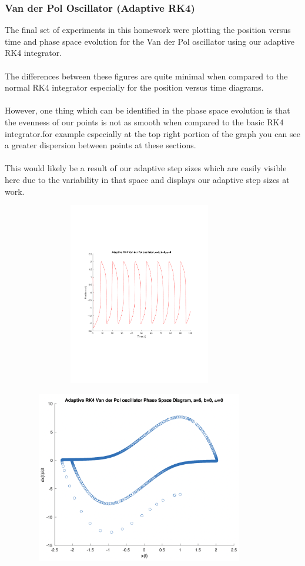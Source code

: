 \documentclass{article}
\begin{document}
\subsubsection{Van der Pol  Oscillator (Adaptive RK4)}
The final set of experiments in this homework were plotting the position versus time and phase space evolution for the Van der Pol oscillator using our adaptive RK4 integrator.\\
\\
The differences between these figures are quite minimal when compared to the normal RK4 integrator especially for the position versus time diagrams.\\
\\ 
However, one thing which can be identified in the phase space evolution is that the evenness of our points is not as smooth when compared to the basic RK4 integrator.for example especially at the top right portion of the graph you can see a greater dispersion between points at these sections.\\
\\
This would likely be a result of our adaptive step sizes which are easily visible here due to the variability in that space and displays our adaptive step sizes at work.
\begin{figure}[!h]
    \centering
    \includegraphics[width=10cm, height=8cm]
    {figures/adaptiveRK4_vdp_pos.pdf}
\end{figure}
\begin{figure}[!h]
    \centering
    \includegraphics[width=10cm, height=7.5cm]
    {figures/adaptiveRK4_phaseSpace.png}
\end{figure}
\end{document}
